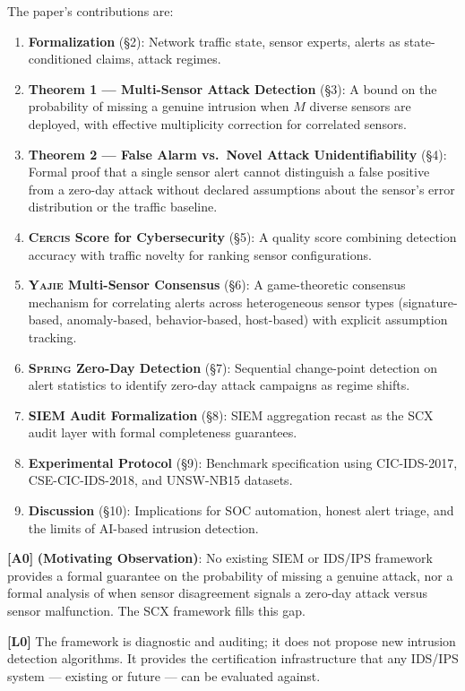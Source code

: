 \documentclass[11pt,a4paper]{article}
\theoremstyle{definition}
\theoremstyle{remark}
\newcommand{\assumptionTag}[1]{\textsf{\textbf{[A#1]}}}
\newcommand{\limitationTag}[1]{\textsf{\textbf{[L#1]}}}
\newcommand{\SCX}{\textsc{SCX}}
\newcommand{\Yajie}{\textsc{Yajie}}
\newcommand{\Cercis}{\textsc{Cercis}}
\newcommand{\Spring}{\textsc{Spring}}
\begin{document}
The paper's contributions are:

\begin{enumerate}[label=(\roman*)]
    \item \textbf{Formalization} (\S2): Network traffic state, sensor experts, alerts as state-conditioned claims, attack regimes.
    \item \textbf{Theorem 1 — Multi-Sensor Attack Detection} (\S3): A bound on the probability of missing a genuine intrusion when $M$ diverse sensors are deployed, with effective multiplicity correction for correlated sensors.
    \item \textbf{Theorem 2 — False Alarm vs.\ Novel Attack Unidentifiability} (\S4): Formal proof that a single sensor alert cannot distinguish a false positive from a zero-day attack without declared assumptions about the sensor's error distribution or the traffic baseline.
    \item \textbf{\Cercis{} Score for Cybersecurity} (\S5): A quality score combining detection accuracy with traffic novelty for ranking sensor configurations.
    \item \textbf{\Yajie{} Multi-Sensor Consensus} (\S6): A game-theoretic consensus mechanism for correlating alerts across heterogeneous sensor types (signature-based, anomaly-based, behavior-based, host-based) with explicit assumption tracking.
    \item \textbf{\Spring{} Zero-Day Detection} (\S7): Sequential change-point detection on alert statistics to identify zero-day attack campaigns as regime shifts.
    \item \textbf{SIEM Audit Formalization} (\S8): SIEM aggregation recast as the SCX audit layer with formal completeness guarantees.
    \item \textbf{Experimental Protocol} (\S9): Benchmark specification using CIC-IDS-2017, CSE-CIC-IDS-2018, and UNSW-NB15 datasets.
    \item \textbf{Discussion} (\S10): Implications for SOC automation, honest alert triage, and the limits of AI-based intrusion detection.
\end{enumerate}

\assumptionTag{0} \textbf{(Motivating Observation)}: No existing SIEM or IDS/IPS framework provides a formal guarantee on the probability of missing a genuine attack, nor a formal analysis of when sensor disagreement signals a zero-day attack versus sensor malfunction. The \SCX{} framework fills this gap.

\limitationTag{0} The framework is diagnostic and auditing; it does not propose new intrusion detection algorithms. It provides the certification infrastructure that any IDS/IPS system — existing or future — can be evaluated against.
\end{document}
